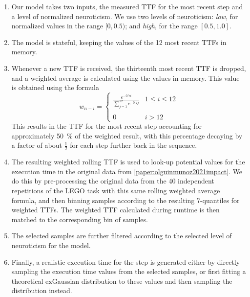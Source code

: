 \begin{enumerate}
    \item Our model takes two inputs, the measured \gls{TTF} for the most recent step and a level of normalized neuroticism.
    We use two levels of neuroticism: \emph{low}, for normalized values in the range \ensuremath{[0, 0.5)}; and \emph{high}, for the range \ensuremath{[0.5, 1.0]}.
    \item The model is stateful, keeping the values of the \num{12} most recent \glspl{TTF} in memory.
    \item Whenever a new \gls{TTF} is received, the thirteenth most recent \gls{TTF} is dropped, and a weighted average is calculated using the values in memory.
    This value is obtained using the formula
    \begin{equation}\label{eq:modelweights}
    w_{n - i} =
    \left\{ \begin{array}{ll}
                \frac{e^{-0.7 i}}{\sum\limits^{12}_{j=1} e^{-0.7 j}} & 1 \leq i \leq 12 \\
                & \\
                0 & i > 12
    \end{array} \right.
    \end{equation}
    This results in the \gls{TTF} for the most recent step accounting for approximately \SI{50}{\percent} of the weighted result, with this percentage decaying by a factor of about \ensuremath{\frac{1}{2}} for each step further back in the sequence.

    \item The resulting weighted rolling \gls{TTF} is used to look-up potential values for the execution time in the original data from \cref{paper:olguinmunoz2021impact}.
    We do this by pre-processing the original data from the \num{40} independent repetitions of the LEGO task with this same rolling weighted average formula, and then binning samples according to the resulting \num{7}-quantiles for weighted \glspl{TTF}.
    The weighted \gls{TTF} calculated during runtime is then matched to the corresponding bin of samples.

    \item The selected samples are further filtered according to the selected level of neuroticism for the model.
    \item Finally, a realistic execution time for the step is generated either by directly sampling the execution time values from the selected samples, or first fitting a theoretical \gls{exGaussian} distribution to these values and then sampling the distribution instead.
\end{enumerate}
